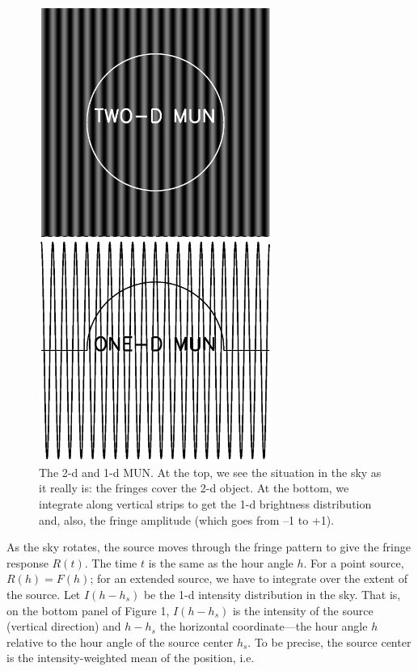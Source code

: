 \documentclass[11pt,preprint]{aastex}
\begin{document}
\begin{figure}[h!]
\begin{center}
\includegraphics[width=3.0in] {interf_fig.ps}
\end{center}
                                                                                
\caption{The 2-d and 1-d MUN. At the top, we see the situation in the
sky as it really is: the fringes cover the 2-d object.
At the bottom, we integrate along vertical strips to get the 1-d
brightness distribution and, also, the fringe amplitude (which goes from
--1 to +1). 
\label{interf_fig} } \end{figure}

	As the sky rotates, the source moves through the fringe pattern
to give the fringe response $R(t)$. The time $t$ is the same as the hour
angle $h$. For a point source, $R(h)= F(h)$; for an extended source, we
have to integrate over the extent of the source.  Let $I(h - h_s)$ be
the 1-d intensity distribution in the sky. That is, on the bottom panel
of Figure 1, $I(h - h_s)$ is the intensity of the source (vertical
direction) and $h-h_s$ the horizontal coordinate---the hour angle $h$
relative to the hour angle of the source center $h_s$. To be precise,
the source center is the intensity-weighted mean of the position, i.e.
\end{document}
